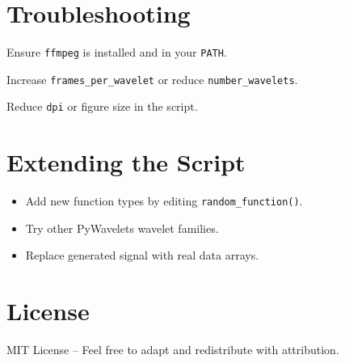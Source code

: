 \documentclass[12pt]{article}
\begin{document}
\section{Troubleshooting}
\begin{description}[leftmargin=1.8cm, style=sameline]
  \item[Missing FFmpeg] Ensure \texttt{ffmpeg} is installed and in your \texttt{PATH}.
  \item[Large GIF files] Increase \texttt{frames\_per\_wavelet} or reduce \texttt{number\_wavelets}.
  \item[Memory errors] Reduce \texttt{dpi} or figure size in the script.
\end{description}

\section{Extending the Script}
\begin{itemize}[nosep]
  \item Add new function types by editing \texttt{random\_function()}.
  \item Try other PyWavelets wavelet families.
  \item Replace generated signal with real data arrays.
\end{itemize}

\section*{License}
MIT License – Feel free to adapt and redistribute with attribution.
\end{document}
